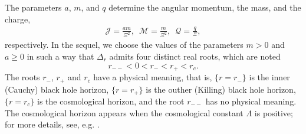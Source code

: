 \documentclass[a4paper, 11pt, reqno]{amsart}
\begin{document}
\noindent The parameters $a$, $m$, and $q$ determine the angular momentum, the mass, and the charge, 
\begin{eqnarray*}
    \mathcal{J}=\frac{am}{\Xi^2},\,\,\,\mathcal{M}=\frac{m}{\Xi^2},\,\,\,\mathcal{Q}=\frac{q}{\Xi},
\end{eqnarray*}
respectively. In the sequel, we choose the values of the parameters $m>0$ and $a\geq 0$ in such a way that $\Delta_r$ admits four distinct real roots, which are noted
$$r_{--}<0<r_{-}<r_{+}<r_{c}.$$  
The roots $r_{-}$, $r_{+}$ and $r_c$ have a physical meaning, that is, $\{r=r_{-}\}$ is the inner (Cauchy) black hole horizon,  $\{r=r_{+}\}$ is the outher (Killing) black hole horizon, $\{r=r_c\}$ is the cosmological horizon, and the root $r_{--}$ has no physical meaning. The cosmological horizon appears when the cosmological constant $\Lambda$ is positive; for more details, see, e.g. \cite{BKO, BK, CLS}.
\end{document}

